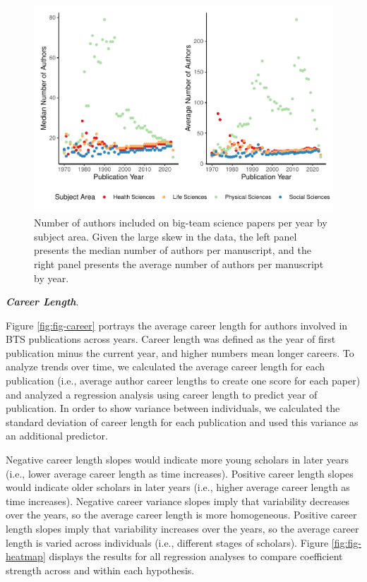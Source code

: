\documentclass[
  man,floatsintext]{apa6}
\begin{document}
\begin{figure}
\centering
\includegraphics{manuscript_scopus_files/figure-latex/fig-author-year-1.pdf}
\caption{\label{fig:fig-author-year}Number of authors included on big-team science papers per year by subject area. Given the large skew in the data, the left panel presents the median number of authors per manuscript, and the right panel presents the average number of authors per manuscript by year.}
\end{figure}

\textbf{\emph{Career Length}}.

Figure \ref{fig:fig-career} portrays the average career length for
authors involved in BTS publications across years. Career length was
defined as the year of first publication minus the current year, and
higher numbers mean longer careers. To analyze trends over time, we
calculated the average career length for each publication (i.e., average
author career lengths to create one score for each paper) and analyzed a
regression analysis using career length to predict year of publication.
In order to show variance between individuals, we calculated the
standard deviation of career length for each publication and used this
variance as an additional predictor.

Negative career length slopes would indicate more young scholars in
later years (i.e., lower average career length as time increases).
Positive career length slopes would indicate older scholars in later
years (i.e., higher average career length as time increases). Negative
career variance slopes imply that variability decreases over the years,
so the average career length is more homogeneous. Positive career length
slopes imply that variability increases over the years, so the average
career length is varied across individuals (i.e., different stages of
scholars). Figure \ref{fig:fig-heatmap} displays the results for all
regression analyses to compare coefficient strength across and within
each hypothesis.
\end{document}
